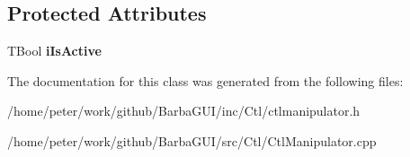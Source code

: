 \subsection*{Protected Attributes}
\begin{DoxyCompactItemize}
\item 
\mbox{\label{classMCtlManipulator_a68584897df4007cfe1ae602ae671198c}} 
T\+Bool {\bfseries i\+Is\+Active}
\end{DoxyCompactItemize}


The documentation for this class was generated from the following files\+:\begin{DoxyCompactItemize}
\item 
/home/peter/work/github/\+Barba\+G\+U\+I/inc/\+Ctl/ctlmanipulator.\+h\item 
/home/peter/work/github/\+Barba\+G\+U\+I/src/\+Ctl/Ctl\+Manipulator.\+cpp\end{DoxyCompactItemize}
